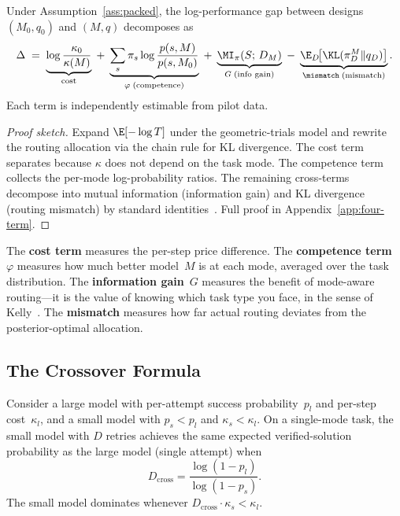 \begin{theorem}
\label{thm:four-term}
Under Assumption~\ref{ass:packed}, the log-performance gap between designs
$(M_0, q_0)$ and $(M, q)$ decomposes as
\begin{equation}
\label{eq:four-term}
  \Delta \;=\;
  \underbrace{\log\frac{\kappa_0}{\kappa(M)}}_{\text{cost}}
  \;+\; \underbrace{\sum_s \pi_s \log\frac{p(s,M)}{p(s,M_0)}}_{\varphi\;\text{(competence)}}
  \;+\; \underbrace{\MI_\pi(S;\,D_M)}_{G\;\text{(info gain)}}
  \;-\; \underbrace{\E_D\!\bigl[\KL(\pi_D^M \| q_D)\bigr]}_{\mismatch\;\text{(mismatch)}}.
\end{equation}
Each term is independently estimable from pilot data.
\end{theorem}

\begin{proof}[Proof sketch]
Expand $\E[-\log T]$ under the geometric-trials model and rewrite the
routing allocation via the chain rule for KL divergence.  The cost term
separates because $\kappa$ does not depend on the task mode.  The
competence term collects the per-mode log-probability ratios.  The
remaining cross-terms decompose into mutual information (information
gain) and KL divergence (routing mismatch) by standard
identities~\citep{beneventano2026framework}.
Full proof in Appendix~\ref{app:four-term}.
\end{proof}

The \textbf{cost term} measures the per-step price difference.  The
\textbf{competence term}~$\varphi$ measures how much better model~$M$ is
at each mode, averaged over the task distribution.  The \textbf{information
gain}~$G$ measures the benefit of mode-aware routing---it is the value of
knowing which task type you face, in the sense of
Kelly~\citeyearpar{kelly1956new}.  The \textbf{mismatch} measures how far
actual routing deviates from the posterior-optimal allocation.

\subsection{The Crossover Formula}
\label{sec:crossover}

\begin{theorem}
\label{thm:crossover}
Consider a large model with per-attempt success probability~$p_l$ and
per-step cost~$\kappa_l$, and a small model with $p_s < p_l$ and
$\kappa_s < \kappa_l$.
On a single-mode task, the small model with $D$ retries achieves the
same expected verified-solution probability as the large model (single
attempt) when
\begin{equation}
\label{eq:crossover}
  D_{\mathrm{cross}} = \frac{\log(1 - p_l)}{\log(1 - p_s)}.
\end{equation}
The small model dominates whenever $D_{\mathrm{cross}} \cdot \kappa_s < \kappa_l$.
\end{theorem}

